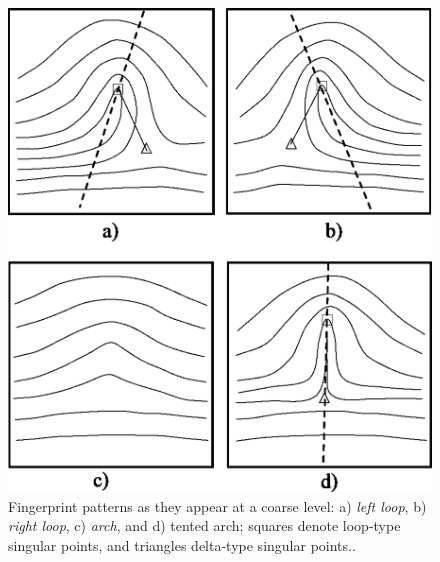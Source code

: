 \documentclass[8pt]{article}
\begin{document}
    \begin{figure}
		\centering
		\includegraphics[width=0.6\linewidth]{img/patterns}
		\caption{Fingerprint patterns as they appear at a coarse level: a) \textit{left loop}, b) \textit{right loop}, c) \textit{\textit{arch}}, and d) tented arch; squares denote loop-type singular points, and triangles
			delta-type singular points..}
		\label{fig:patterns}
	\end{figure}%





\end{document}

